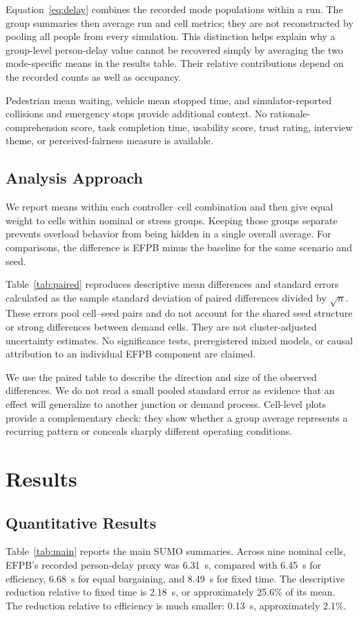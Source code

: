 \documentclass[sigconf]{acmart}
\begin{document}
Equation~\ref{eq:delay} combines the recorded mode populations
within a run. The group summaries then average run and cell
metrics; they are not reconstructed by pooling all people from
every simulation. This distinction helps explain why a group-level
person-delay value cannot be recovered simply by averaging the
two mode-specific means in the results table. Their relative
contributions depend on the recorded counts as well as occupancy.

Pedestrian mean waiting, vehicle mean stopped time, and
simulator-reported collisions and emergency stops provide
additional context. No rationale-comprehension score, task
completion time, usability score, trust rating, interview theme,
or perceived-fairness measure is available.

\subsection{Analysis Approach}
We report means within each controller--cell combination and
then give equal weight to cells within nominal or stress groups.
Keeping those groups separate prevents overload behavior from
being hidden in a single overall average. For comparisons, the
difference is EFPB minus the baseline for the same scenario and
seed.

Table~\ref{tab:paired} reproduces descriptive mean differences
and standard errors calculated as the sample standard deviation
of paired differences divided by $\sqrt{n}$. These errors pool
cell--seed pairs and do not account for the shared seed structure
or strong differences between demand cells. They are not
cluster-adjusted uncertainty estimates. No significance tests,
preregistered mixed models, or causal attribution to an individual
EFPB component are claimed.

We use the paired table to describe the direction and size of the
observed differences. We do not read a small pooled standard error
as evidence that an effect will generalize to another junction or
demand process. Cell-level plots provide a complementary check:
they show whether a group average represents a recurring pattern
or conceals sharply different operating conditions.

\section{Results}
\subsection{Quantitative Results}
Table~\ref{tab:main} reports the main SUMO summaries. Across
nine nominal cells, EFPB's recorded person-delay proxy was
6.31~s, compared with 6.45~s for efficiency, 6.68~s for equal
bargaining, and 8.49~s for fixed time. The descriptive reduction
relative to fixed time is 2.18~s, or approximately 25.6\% of its
mean. The reduction relative to efficiency is much smaller:
0.13~s, approximately 2.1\%.
\end{document}
